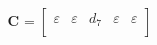 \documentclass[11pt, a4paper, fleqn]{article}
\begin{document}
\begin{equation*}
\mathbf{C}_{{}} = 
\left[\begin{array}{ ccccc }
\varepsilon	&\varepsilon	&d_7	&\varepsilon	&\varepsilon\\
\end{array}\right]
\end{equation*}
\end{document}
